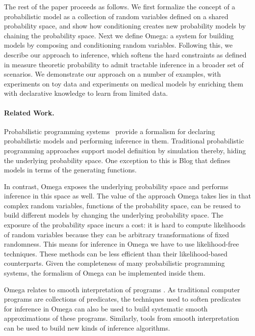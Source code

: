 
The rest of the paper proceeds as follows. We first formalize the concept of a probabilistic model as a collection of random variables defined on a shared probability space, and show how conditioning creates new probability models by chaining the probability space.  Next we define Omega: a system for building models by composing and conditioning random variables.
Following this, we describe our approach to inference, which softens the hard constraints as defined in measure theoretic probability to admit tractable inference in a broader set of scenarios. We demonstrate our approach on a number of examples, with experiments on toy data and experiments on medical models by enriching them with declarative knowledge to learn from limited data.

\paragraph{Related Work.}
Probabilistic programming systems~\citep{milch20071, wood2014new,mansinghka2014venture,goodman2008church,carpenter2017stan} provide a formalism
for declaring probabilistic models and performing inference
in them. Traditional probabilistic programming approaches support model definition by simulation thereby, hiding the underlying probability space. 
One exception to this is Blog \citep{milch20071} 
that defines models in terms of the generating functions.

In contrast, Omega exposes the underlying probability space and performs inference in this space as well. The value of the approach Omega takes lies in that complex random variables, functions of the probability space, can be reused to build different models by changing the underlying probability space. The exposure of the probability space incurs a cost: it is hard to compute likelihoods of random variables because they can be arbitrary transformations of fixed randomness. This means for inference in Omega we have to use likelihood-free techniques. These methods can be less efficient than their likelihood-based counterparts. Given the completeness of many probabilistic programming systems, the formalism of Omega can be implemented inside them.

Omega relates to smooth interpretation of programs \citep{chaudhuri2010smooth}.
As traditional computer programs are collections of predicates, the techniques used to soften predicates for inference in Omega can also be used to build systematic smooth approximations of these programs. Similarly, tools from smooth interpretation can be used to build new kinds of inference algorithms.

